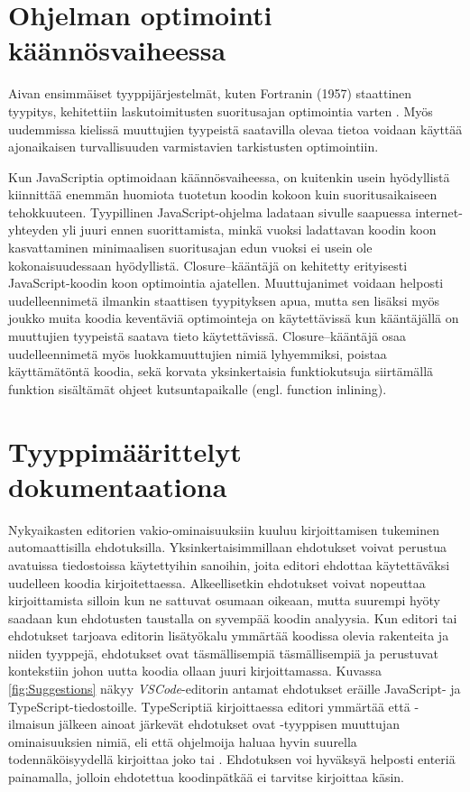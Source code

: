 \section{Ohjelman optimointi käännösvaiheessa}
Aivan ensimmäiset tyyppijärjestelmät, kuten Fortranin (1957) staattinen tyypitys,
kehitettiin laskutoimitusten suoritusajan optimointia varten \cite{TypesAndProgrammingLanguages}.
Myös uudemmissa kielissä muuttujien tyypeistä saatavilla olevaa tietoa
voidaan käyttää ajonaikaisen turvallisuuden varmistavien tarkistusten
optimointiin.

Kun JavaScriptia optimoidaan käännösvaiheessa, on kuitenkin usein hyödyllistä
kiinnittää enemmän huomiota tuotetun koodin kokoon kuin suoritusaikaiseen
tehokkuuteen. Tyypillinen JavaScript-ohjelma ladataan sivulle saapuessa
internet-yhteyden yli juuri ennen suorittamista, minkä vuoksi ladattavan
koodin koon kasvattaminen minimaalisen suoritusajan edun vuoksi ei usein ole
kokonaisuudessaan hyödyllistä. Closure–kääntäjä on kehitetty erityisesti
JavaScript-koodin koon optimointia ajatellen. Muuttujanimet voidaan helposti
uudelleennimetä ilmankin staattisen tyypityksen apua, mutta sen lisäksi myös
joukko muita koodia keventäviä optimointeja on käytettävissä kun kääntäjällä
on muuttujien tyypeistä saatava tieto käytettävissä. Closure–kääntäjä osaa
uudelleennimetä myös luokkamuuttujien nimiä lyhyemmiksi, poistaa
käyttämätöntä koodia, sekä korvata yksinkertaisia funktiokutsuja siirtämällä
funktion sisältämät ohjeet kutsuntapaikalle (engl. function inlining).

\section{Tyyppimäärittelyt dokumentaationa}
Nykyaikasten editorien vakio-ominaisuuksiin kuuluu kirjoittamisen tukeminen
automaattisilla ehdotuksilla. Yksinkertaisimmillaan ehdotukset voivat
perustua avatuissa tiedostoissa käytettyihin sanoihin, joita editori ehdottaa
käytettäväksi uudelleen koodia kirjoitettaessa. Alkeellisetkin ehdotukset
voivat nopeuttaa kirjoittamista silloin kun ne sattuvat osumaan oikeaan,
mutta suurempi hyöty saadaan kun ehdotusten taustalla on syvempää koodin
analyysia. Kun editori tai ehdotukset tarjoava editorin lisätyökalu ymmärtää
koodissa olevia rakenteita ja niiden tyyppejä, ehdotukset ovat täsmällisempiä
täsmällisempiä ja perustuvat kontekstiin johon uutta koodia ollaan juuri
kirjoittamassa. Kuvassa \ref{fig:Suggestions} näkyy\newline
\textit{VSCode}-editorin antamat ehdotukset eräille JavaScript-
ja TypeScript-tiedostoille.\newline
TypeScriptiä kirjoittaessa editori ymmärtää että -ilmaisun
jälkeen ainoat järkevät ehdotukset ovat -tyyppisen muuttujan
ominaisuuksien nimiä, eli että ohjelmoija haluaa hyvin suurella todennäköisyydellä
kirjoittaa joko  tai .
Ehdotuksen voi hyväksyä helposti enteriä painamalla, jolloin ehdotettua
koodinpätkää ei tarvitse kirjoittaa käsin.

